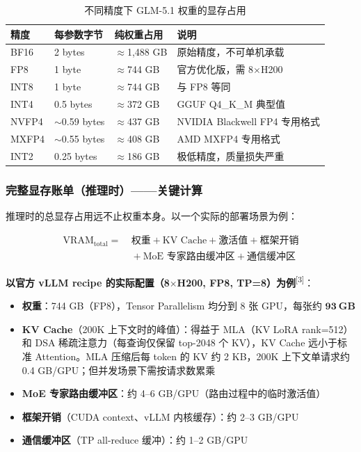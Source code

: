 \documentclass[UTF8,a4paper,10pt,oneside]{ctexart}
\begin{document}
\begin{table}[htbp]
\centering
\caption{不同精度下 GLM-5.1 权重的显存占用}
\begin{tabular}{p{2cm}p{3cm}p{3.5cm}p{3.5cm}}
\hline
\textbf{精度} & \textbf{每参数字节} & \textbf{纯权重占用} & \textbf{说明} \\
\hline
BF16 & 2 bytes & $\approx$1,488 GB & 原始精度，不可单机承载 \\
FP8 & 1 byte & $\approx$744 GB & 官方优化版，需 8$\times$H200 \\
INT8 & 1 byte & $\approx$744 GB & 与 FP8 等同 \\
INT4 & 0.5 bytes & $\approx$372 GB & GGUF Q4\_K\_M 典型值 \\
NVFP4 & $\sim$0.59 bytes & $\approx$437 GB & NVIDIA Blackwell FP4 专用格式 \\
MXFP4 & $\sim$0.55 bytes & $\approx$408 GB & AMD MXFP4 专用格式 \\
INT2 & 0.25 bytes & $\approx$186 GB & 极低精度，质量损失严重 \\
\hline
\end{tabular}
\end{table}

\subsubsection{完整显存账单（推理时）——关键计算}

推理时的总显存占用远不止权重本身。以一个实际的部署场景为例：

\begin{equation}
\begin{aligned}
\text{VRAM}_{\text{total}} = &\ \text{权重} + \text{KV Cache} + \text{激活值} + \text{框架开销} \\
                            &\ + \text{MoE 专家路由缓冲区} + \text{通信缓冲区}
\end{aligned}
\end{equation}

\textbf{以官方 vLLM recipe 的实际配置（8$\times$H200, FP8, TP=8）为例}\textsuperscript{[3]}：

\begin{itemize}
    \item \textbf{权重}：744 GB（FP8），Tensor Parallelism 均分到 8 张 GPU，每张约 $\mathbf{93\ GB}$
    \item \textbf{KV Cache}（200K 上下文时的峰值）：得益于 MLA（KV LoRA rank=512）和 DSA 稀疏注意力（每查询仅保留 top-2048 个 KV），KV Cache 远小于标准 Attention。MLA 压缩后每 token 的 KV 约 2 KB，200K 上下文单请求约 0.4 GB/GPU；但并发场景下需按请求数累乘
    \item \textbf{MoE 专家路由缓冲区}：约 4--6 GB/GPU（路由过程中的临时激活值）
    \item \textbf{框架开销}（CUDA context、vLLM 内核缓存）：约 2--3 GB/GPU
    \item \textbf{通信缓冲区}（TP all-reduce 缓冲）：约 1--2 GB/GPU
\end{itemize}
\end{document}
